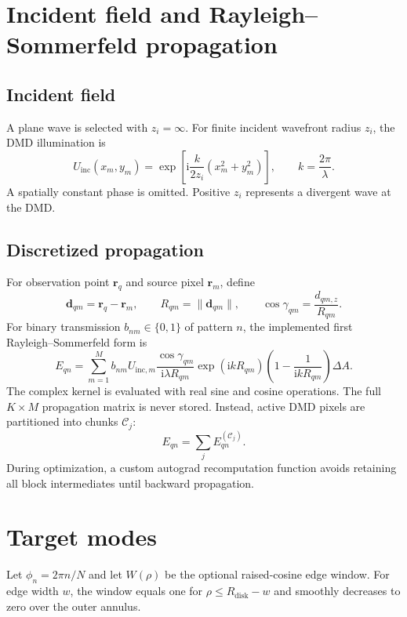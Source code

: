 \documentclass[11pt,a4paper]{article}
\newcommand{\vect}[1]{\bm{#1}}
\newcommand{\Rdisk}{R_{\mathrm{disk}}}
\newcommand{\ii}{\mathrm{i}}
\begin{document}
\section{Incident field and Rayleigh--Sommerfeld propagation}
\subsection{Incident field}
A plane wave is selected with $z_i=\infty$. For finite incident wavefront radius $z_i$, the DMD illumination is
\begin{equation}
 U_{\mathrm{inc}}(x_m,y_m)=\exp\!\left[\ii\frac{k}{2z_i}(x_m^2+y_m^2)\right],
 \qquad k=\frac{2\pi}{\lambda}.
 \label{eq:incident}
\end{equation}
A spatially constant phase is omitted. Positive $z_i$ represents a divergent wave at the DMD.

\subsection{Discretized propagation}
For observation point $\vect r_q$ and source pixel $\vect r_m$, define
\begin{equation}
 \vect d_{qm}=\vect r_q-\vect r_m,\qquad R_{qm}=\lVert\vect d_{qm}\rVert,
 \qquad \cos\gamma_{qm}=\frac{d_{qm,z}}{R_{qm}}.
\end{equation}
For binary transmission $b_{nm}\in\{0,1\}$ of pattern $n$, the implemented first Rayleigh--Sommerfeld form is
\begin{equation}
 E_{qn}=\sum_{m=1}^{M} b_{nm}U_{\mathrm{inc},m}
 \frac{\cos\gamma_{qm}}{\ii\lambda R_{qm}}
 \exp(\ii kR_{qm})\left(1-\frac{1}{\ii kR_{qm}}\right)\Delta A.
 \label{eq:rs}
\end{equation}
The complex kernel is evaluated with real sine and cosine operations. The full $K\times M$ propagation matrix is never stored. Instead, active DMD pixels are partitioned into chunks $\mathcal C_j$:
\begin{equation}
 E_{qn}=\sum_j E_{qn}^{(\mathcal C_j)}.
\end{equation}
During optimization, a custom autograd recomputation function avoids retaining all block intermediates until backward propagation.

\section{Target modes}
Let $\phi_n=2\pi n/N$ and let $W(\rho)$ be the optional raised-cosine edge window. For edge width $w$, the window equals one for $\rho\leq\Rdisk-w$ and smoothly decreases to zero over the outer annulus.
\end{document}
